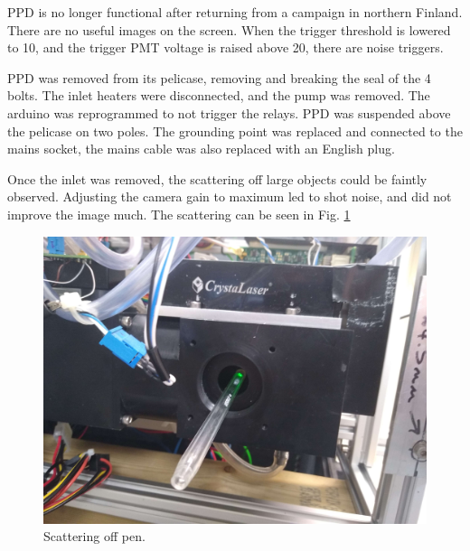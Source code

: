 

PPD is no longer functional after returning from a campaign in northern Finland. There are no useful images on the screen. When the trigger threshold is lowered to 10, and the trigger PMT voltage is raised above 20, there are noise triggers.

PPD was removed from its pelicase, removing and breaking the seal of the 4 bolts. The inlet heaters were disconnected, and the pump was removed. The arduino was reprogrammed to not trigger the relays. PPD was suspended above  the pelicase on two poles. The grounding point was replaced and connected to the mains socket, the mains cable was also replaced with an English plug.

Once the inlet was removed, the scattering off large objects could be faintly observed. Adjusting the camera gain to maximum led to shot noise, and did not improve the image much. The scattering can be seen in Fig. \ref{fig:PPDPenScatter}

\begin{figure}[H]
\begin{center}
\includegraphics[width=0.5\linewidth]{Figures/PPDPenScatter}
\end{center}
\caption{Scattering off pen.}
\label{fig:PPDPenScatter}
\end{figure}
